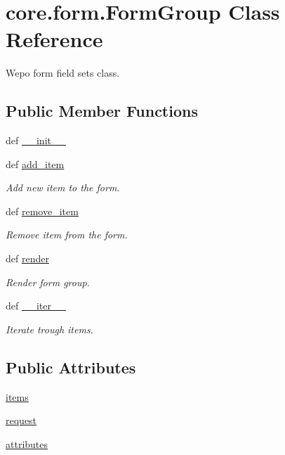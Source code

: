 \hypertarget{classcore_1_1form_1_1FormGroup}{\section{core.\-form.\-Form\-Group Class Reference}
\label{classcore_1_1form_1_1FormGroup}
}


Wepo form field sets class.  


\subsection*{Public Member Functions}
\begin{DoxyCompactItemize}
\item 
def \hyperlink{classcore_1_1form_1_1FormGroup_a89e8497987edca32795491ad1238aab8}{\-\_\-\-\_\-init\-\_\-\-\_\-}
\item 
def \hyperlink{classcore_1_1form_1_1FormGroup_a2601bc2dc15971645ed97c73af5bfc31}{add\-\_\-item}
\begin{DoxyCompactList}\small\item\em Add new item to the form. \end{DoxyCompactList}\item 
def \hyperlink{classcore_1_1form_1_1FormGroup_aaaee5425b1449922053ec97050e146bd}{remove\-\_\-item}
\begin{DoxyCompactList}\small\item\em Remove item from the form. \end{DoxyCompactList}\item 
def \hyperlink{classcore_1_1form_1_1FormGroup_ac341c438ac1772576b2ab7364f6b0702}{render}
\begin{DoxyCompactList}\small\item\em Render form group. \end{DoxyCompactList}\item 
def \hyperlink{classcore_1_1form_1_1FormGroup_a6a0f5cdacadba5a4ae75330852edbd5a}{\-\_\-\-\_\-iter\-\_\-\-\_\-}
\begin{DoxyCompactList}\small\item\em Iterate trough items. \end{DoxyCompactList}\end{DoxyCompactItemize}
\subsection*{Public Attributes}
\begin{DoxyCompactItemize}
\item 
\hyperlink{classcore_1_1form_1_1FormGroup_a322dc0daa2a6a01b88ac158cfd78619a}{items}
\item 
\hyperlink{classcore_1_1form_1_1FormGroup_acfa014f999bdb99af51a14f6754cff9f}{request}
\item 
\hyperlink{classcore_1_1form_1_1FormGroup_a7b682a9b4f5c15cf28f2c2d2d5a2d9ef}{attributes}
\end{DoxyCompactItemize}


